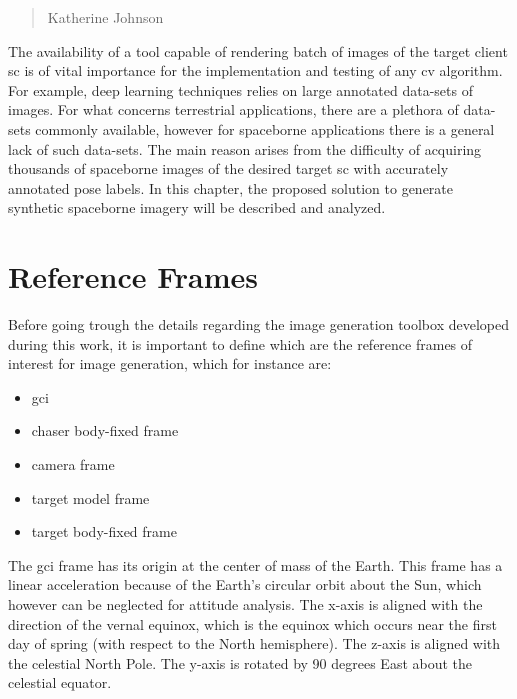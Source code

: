\begin{quotation}
  {\footnotesize
    \begin{flushright}
      Katherine Johnson
    \end{flushright}
  }
\end{quotation}
\vspace{0.5cm}

The availability of a tool capable of rendering batch of images of the target client \acrshort{sc} is of vital importance for the implementation and testing of any \acrshort{cv} algorithm. For example, deep learning techniques relies on large annotated data-sets of images. For what concerns terrestrial applications, there are a plethora of data-sets commonly available, however for spaceborne applications there is a general lack of such data-sets. The main reason arises from the difficulty of acquiring thousands of spaceborne images of the desired target \acrshort{sc} with accurately annotated pose labels. In this chapter, the proposed solution to generate synthetic spaceborne imagery will be described and analyzed.

\section{Reference Frames}\label{sec:refereceFrames}
Before going trough the details regarding the image generation toolbox developed during this work, it is important to define which are the reference frames of interest for image generation, which for instance are: 

\begin{itemize}
  \item \acrfull{gci}
  \item chaser body-fixed frame
  \item camera frame
  \item target model frame
  \item target body-fixed frame
\end{itemize}

The \acrshort{gci} frame has its origin at the center of mass of the Earth. This frame has a linear acceleration because of the Earth's circular orbit about the Sun, which however can be neglected for attitude analysis. The x-axis is aligned with the direction of the vernal equinox, which is the equinox which occurs near the first day of spring (with respect to the North hemisphere). The z-axis is aligned with the celestial North Pole. The y-axis is rotated by 90 degrees East about the celestial equator.

